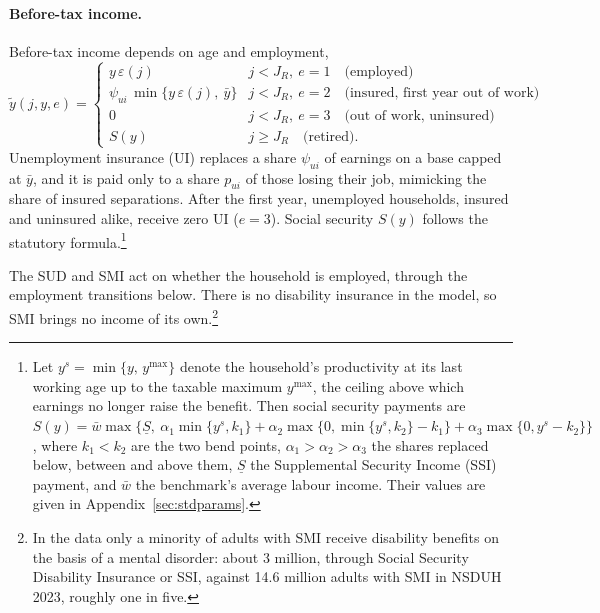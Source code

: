 \documentclass[10pt]{article}
\begin{document}
\paragraph{Before-tax income.} Before-tax income depends on age and employment,
\begin{equation}\label{eq:fincome}
\tilde y(j,y,e)=
\begin{cases}
y\,\varepsilon(j) & j<J_{R},\ e=1 \quad\text{(employed)}\\[2pt]
\psi_{ui}\,\min\{y\,\varepsilon(j),\ \bar y\} & j<J_{R},\ e=2 \quad\text{(insured, first year out of work)}\\[2pt]
0 & j<J_{R},\ e=3 \quad\text{(out of work, uninsured)}\\[2pt]
S(y) & j\ge J_{R} \quad\text{(retired)} .
\end{cases}
\end{equation}
Unemployment insurance (UI) replaces a share $\psi_{ui}$ of earnings on a base capped
at $\bar y$, and it is paid only to a share $p_{ui}$ of those losing their job, mimicking the share of
insured separations. After the first year, unemployed households, insured and uninsured alike, receive
zero UI ($e=3$). Social security $S(y)$ follows the statutory formula.\footnote{\label{fn:ss}Let $y^{s}=\min\{y,\,y^{\max}\}$ denote the household's productivity at its last
working age up to the taxable maximum $y^{\max}$, the ceiling above which earnings no longer raise the benefit. Then social security payments are $S(y)=\bar w\max\big\{\underline S,\ \alpha_1\min\{y^{s},k_1\}+\alpha_2\max\{0,\min\{y^{s},k_2\}-k_1\}
+\alpha_3\max\{0,y^{s}-k_2\}\big\}$, where $k_1<k_2$ are the two bend points,
$\alpha_1>\alpha_2>\alpha_3$ the shares replaced below, between and above them,
$\underline S$ the Supplemental Security Income (SSI) payment, and $\bar w$ the benchmark's average labour income. Their values are given in Appendix~\ref{sec:stdparams}.}

The SUD and SMI act on whether the household is employed, through the
employment transitions below. There is no
disability insurance in the model, so SMI brings no income of its own.\footnote{In the
data only a minority of adults with SMI receive disability benefits on the basis of a mental
disorder: about 3 million, through Social Security Disability Insurance or SSI, against 14.6
million adults with SMI in NSDUH 2023, roughly one in five.}
\end{document}
